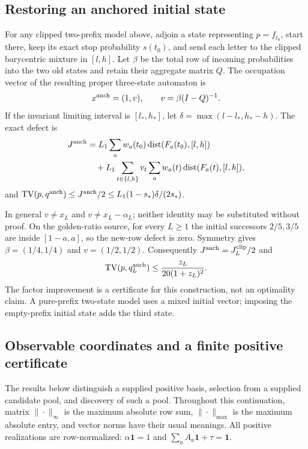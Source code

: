 \subsection{Restoring an anchored initial state}
\label{II:U:sec:rank-two-anchored}
\begin{proposition}
\label{II:U:prop:rank-two-anchored}
For any clipped two-prefix model above, adjoin a state representing
$p=f_{t_0}$, start there, keep its exact stop probability $s(t_0)$,
and send each letter to the clipped barycentric mixture in $[l,h]$.
Let $\beta$ be the total row of incoming probabilities into the two
old states and retain their aggregate matrix $Q$. The occupation
vector of the resulting proper three-state automaton is
\[
 x^{\rm anch}=(1,v),\qquad v=\beta(I-Q)^{-1}.
\]
If the invariant limiting interval is $[l_*,h_*]$, let
$\delta=\max(l-l_*,h_*-h)$. The exact defect is
\begin{align}
 J^{\rm anch}
 &=L_1\sum_a w_a(t_0)
       \operatorname{dist}(F_a(t_0),[l,h])\notag\\
 &\quad+L_1\sum_{t\in\{l,h\}}v_t
       \sum_a w_a(t)\operatorname{dist}(F_a(t),[l,h]),
 \label{II:U:eq:rank-two-anchored-defect}
\end{align}
and
$\operatorname{TV}(p,q^{\rm anch})\le J^{\rm anch}/2
\le L_1(1-s_*)\delta/(2s_*)$.
\end{proposition}

In general $v\ne x_L$ and $v\ne x_L-\alpha_L$; neither identity may be
substituted without proof. On the golden-ratio source, for every
$L\ge1$ the initial successors $2/5,3/5$ are inside $[1-a,a]$,
so the new-row defect is zero. Symmetry gives
$\beta=(1/4,1/4)$ and $v=(1/2,1/2)$.
Consequently $J^{\rm anch}=J_L^{\rm clip}/2$ and
\[
 \operatorname{TV}(p,q_L^{\rm anch})\le\frac{z_L}{20(1+z_L)^2}.
\]
The factor improvement is a certificate for this construction, not an
optimality claim. A pure-prefix two-state model uses a mixed initial
vector; imposing the empty-prefix initial state adds the third state.


\subsection{Observable coordinates and a finite positive certificate}
\label{II:U:sec:observable-positive}
The results below distinguish a supplied positive basis, selection from a
supplied candidate pool, and discovery of such a pool. Throughout this
continuation, matrix $\|\cdot\|_\infty$ is the maximum absolute row sum,
$\|\cdot\|_{\max}$ is the maximum absolute entry, and vector norms have
their usual meanings. All positive realizations are row-normalized:
$\alpha\mathbf1=1$ and $\sum_a A_a\mathbf1+\tau=\mathbf1$.

